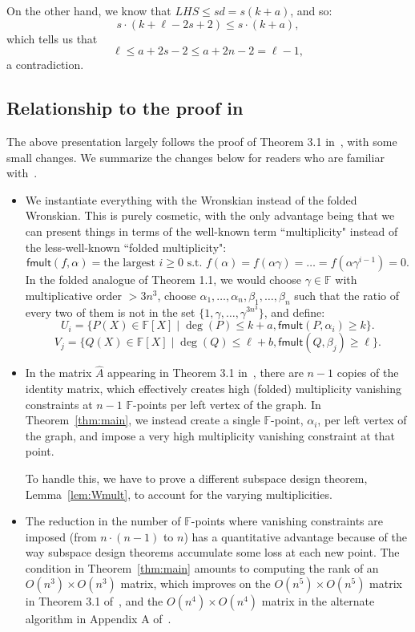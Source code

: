 \documentclass{article}
\newcommand{\F}{\mathbb{F}}
\newcommand{\fmult}{\mathsf{fmult}}
\begin{document}
On the other hand, we know that $LHS \leq sd = s(k+a)$, and so:
$$  s \cdot (k + \ell - 2s + 2 ) \leq s \cdot (k+a),$$
which tells us that 
$$\ell \leq a + 2s - 2 \leq a + 2n - 2 = \ell -1,$$
a contradiction.

\subsection{Relationship to the proof in~\cite{CGGRT26}}

The above presentation largely follows the proof of Theorem 3.1 in~\cite{CGGRT26},
with some small changes. We summarize the changes below for readers who are familiar with~\cite{CGGRT26}.
\begin{itemize}
    \item We instantiate everything with the Wronskian instead of the folded Wronskian. This is purely cosmetic, with the only advantage being that we can present things in terms of the well-known term ``multiplicity" instead of the less-well-known ``folded multiplicity":
    $$ \fmult(f, \alpha) = \mbox{the largest $i \geq 0$ s.t. } f(\alpha) = f(\alpha \gamma) = \ldots = f(\alpha \gamma^{i-1}) = 0.$$
    In the folded analogue of Theorem 1.1, we would choose $\gamma \in \F$ with multiplicative order $> 3n^3$,
    choose $\alpha_1, \ldots, \alpha_n, \beta_1, \ldots, \beta_n$ such that the ratio of every two of them is not in the set
    $\{1, \gamma, \ldots, \gamma^{3n^3} \}$, and define:
    $$U_i = \{ P(X) \in \F[X] \mid \deg(P) \leq k+a, \fmult(P, \alpha_i) \geq k \}.$$
    $$V_j = \{ Q(X) \in \F[X] \mid \deg(Q) \leq \ell + b, \fmult(Q, \beta_j) \geq \ell \}.$$
    
    \item In the matrix $\widehat{A}$ appearing in Theorem 3.1 in~\cite{CGGRT26}, there are $n-1$ copies of the identity matrix, which effectively creates high (folded) multiplicity vanishing constraints at $n-1$ $\F$-points per left vertex of the graph. In Theorem~\ref{thm:main}, we instead create a single $\F$-point, $\alpha_i$, per left vertex of the graph, and impose a very high multiplicity vanishing constraint at that point.

    To handle this, we have to prove a different subspace design theorem, Lemma~\ref{lem:Wmult}, to account for the varying multiplicities.

    \item The reduction in the number of $\F$-points where vanishing constraints are imposed (from $n \cdot (n-1)$ to $n$) has a quantitative advantage because of the way subspace design theorems accumulate some loss at each new point. The condition in Theorem~\ref{thm:main} amounts to computing the rank of an $O(n^3) \times O(n^3)$ matrix, which improves on the $O(n^5) \times O(n^5)$ matrix in Theorem 3.1 of~\cite{CGGRT26}, and the $O(n^4) \times O(n^4)$ matrix in the alternate algorithm in Appendix A of~\cite{CGGRT26}.


\end{itemize}
\end{document}
